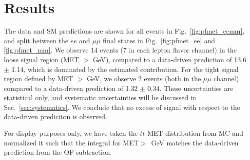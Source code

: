 
\section{Results}
\label{sec:results}

The data and SM predictions are shown for all events in 
Fig.~\ref{fig:pfmet_eemm}, 
and split between the $ee$
and $\mu\mu$ final states in 
Fig.~\ref{fig:pfmet_ee} and \ref{fig:pfmet_mm}. 
We observe 14 events (7 in each lepton flavor channel) 
in the loose signal region (MET $>$ \signalmetl GeV), 
compared to a data-driven prediction of 
13.6 $\pm$ 1.14,
which is dominated by the estimated \ttbar contribution. 
For the tight signal region defined by MET $>$ \signalmett GeV, 
we observe 2 events (both in the $\mu\mu$ channel) compared to a 
data-driven prediction of 
1.32 $\pm$ 0.34.
These uncertainties are statistical only, and systematic uncertainties will be 
discussed in Sec.~\ref{sec:systematics}. We conclude that no excess of signal 
with respect to the data-driven prediciton is observed.

For display purposes only, we have taken the
$t\bar{t}$ MET distribution from MC and normalized it such that the integral for 
MET$>$\signalmetl~GeV matches the data-driven prediction
from the OF subtraction. 



\newcommand{\resulttitle}
{                        &   MET $>30$  GeV    &   MET $>60$  GeV    &   MET $>100$ GeV    &   MET $>200$ GeV \\}

